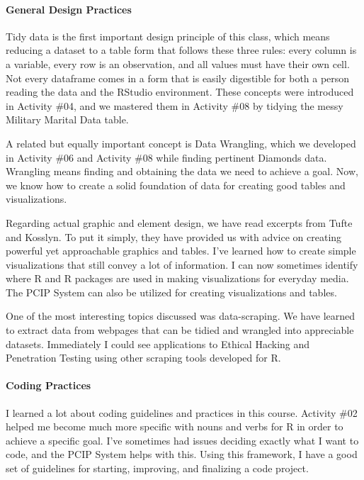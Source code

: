 \documentclass[
]{article}
\begin{document}
\hypertarget{general-design-practices}{%
\paragraph{General Design Practices}\label{general-design-practices}}

Tidy data is the first important design principle of this class, which
means reducing a dataset to a table form that follows these three rules:
every column is a variable, every row is an observation, and all values
must have their own cell. Not every dataframe comes in a form that is
easily digestible for both a person reading the data and the RStudio
environment. These concepts were introduced in Activity \#04, and we
mastered them in Activity \#08 by tidying the messy Military Marital
Data table.

A related but equally important concept is Data Wrangling, which we
developed in Activity \#06 and Activity \#08 while finding pertinent
Diamonds data. Wrangling means finding and obtaining the data we need to
achieve a goal. Now, we know how to create a solid foundation of data
for creating good tables and visualizations.

Regarding actual graphic and element design, we have read excerpts from
Tufte and Kosslyn. To put it simply, they have provided us with advice
on creating powerful yet approachable graphics and tables. I've learned
how to create simple visualizations that still convey a lot of
information. I can now sometimes identify where R and R packages are
used in making visualizations for everyday media. The PCIP System can
also be utilized for creating visualizations and tables.

One of the most interesting topics discussed was data-scraping. We have
learned to extract data from webpages that can be tidied and wrangled
into appreciable datasets. Immediately I could see applications to
Ethical Hacking and Penetration Testing using other scraping tools
developed for R.

\hypertarget{coding-practices}{%
\paragraph{Coding Practices}\label{coding-practices}}

I learned a lot about coding guidelines and practices in this course.
Activity \#02 helped me become much more specific with nouns and verbs
for R in order to achieve a specific goal. I've sometimes had issues
deciding exactly what I want to code, and the PCIP System helps with
this. Using this framework, I have a good set of guidelines for
starting, improving, and finalizing a code project.
\end{document}
